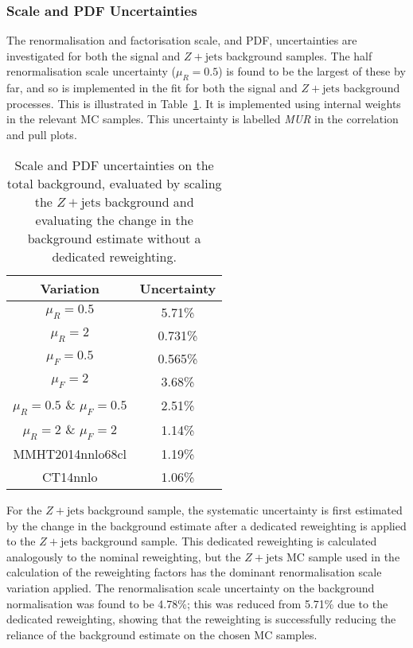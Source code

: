 \documentclass[NOTE, atlasdraft=true, texlive=2017, UKenglish]{\ATLASLATEXPATH atlasdoc}
\begin{document}
\subsubsection{Scale and PDF Uncertainties}
\label{sec:sysscale}

The renormalisation and factorisation scale, and PDF, uncertainties are investigated for both the signal and $Z+\text{jets}$ background samples. The half renormalisation scale uncertainty ($\mu_R=0.5$) is found to be the largest of these by far, and so is implemented in the fit for both the signal and $Z+\text{jets}$ background processes. This is illustrated in Table~\ref{tab:scalesys}. It is implemented using internal weights in the relevant MC samples. This uncertainty is labelled \emph{MUR} in the correlation and pull plots.

\begin{table}[!htbp]{\footnotesize\renewcommand{\arraystretch}{1.2}
  \begin{center}
    \footnotesize
    \begin{tabular}{|cc|}
      \hline
      Variation & Uncertainty \\
      \hline
      $\mu_R=0.5$ & 5.71\%\\
      $\mu_R=2$ & 0.731\%\\
      $\mu_F=0.5$ & 0.565\%\\
      $\mu_F=2$ & 3.68\%\\
      $\mu_R=0.5$ \& $\mu_F=0.5$ & 2.51\%\\
      $\mu_R=2$ \& $\mu_F=2$ & 1.14\%\\
      MMHT2014nnlo68cl & 1.19\%\\
      CT14nnlo & 1.06\%\\
      \hline
      \end{tabular}
    \caption{Scale and PDF uncertainties on the total background, evaluated by scaling the $Z+\text{jets}$ background and evaluating the change in the background estimate without a dedicated reweighting.}
    \label{tab:scalesys}
  \end{center}}
\end{table}

For the $Z+\text{jets}$ background sample, the systematic uncertainty is first estimated by the change in the background estimate after a dedicated reweighting is applied to the $Z+\text{jets}$ background sample. This dedicated reweighting is calculated analogously to the nominal reweighting, but the $Z+\text{jets}$ MC sample used in the calculation of the reweighting factors has the dominant renormalisation scale variation applied. The renormalisation scale uncertainty on the background normalisation was found to be 4.78\%; this was reduced from 5.71\% due to the dedicated reweighting, showing that the reweighting is successfully reducing the reliance of the background estimate on the chosen MC samples.
\end{document}
